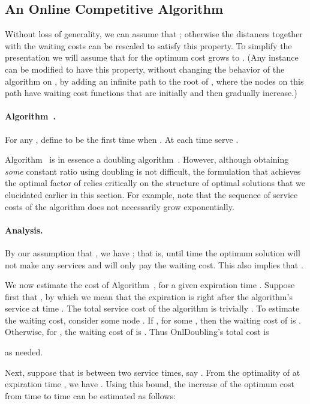 \documentclass[a4paper]{article}
\newcommand{\algDoubling}{\mbox{\sc OnlDoubling}}
\begin{document}
\subsection{An Online Competitive Algorithm}  

Without loss of generality, we can assume that
; otherwise the distances
together with the waiting costs can be rescaled to satisfy this
property. To simplify the presentation we will assume that for
 the optimum cost grows to .  (Any
instance can be modified to have this property, without changing the
behavior of the algorithm on , by adding an infinite path to
the root of , where the nodes on this path have waiting cost
functions that are initially  and then gradually increase.)


\paragraph{Algorithm~.}
For any , define  to be the first time when .
At each time  serve .

\smallskip

Algorithm~ is in essence a doubling algorithm~\cite{doubling-sigact}. However, although 
obtaining \emph{some} constant ratio using doubling is not difficult, the formulation that achieves 
the optimal factor of  relies critically on the structure of optimal solutions that we elucidated 
earlier in this section. For example, note that the sequence of service costs of the algorithm 
does not necessarily grow exponentially.


\paragraph{Analysis.}

By our assumption that , we have
; that is, until time  the optimum solution will not make any services and will
only pay the waiting cost. This also implies that .

We now estimate the cost of Algorithm~, for a given expiration time .
Suppose first that , by which we mean that the expiration is right after the algorithm's service at 
time . The total service cost of the algorithm is trivially .
To estimate the waiting cost, consider some node . If , for some , then
the waiting cost of  is . Otherwise, for , the waiting cost of 
is .
Thus {\algDoubling}'s total cost is

as needed. 

Next, suppose that  is between two service times, say .
From the optimality of  at expiration time , we have
.
Using this bound,
the increase of the optimum cost from time  to time  can be estimated 
as follows:
\end{document}
